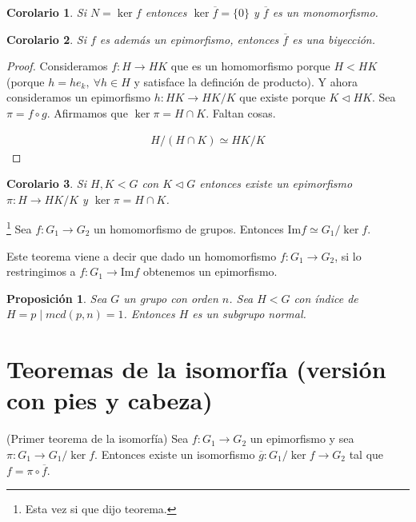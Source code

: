\documentclass{book}
\newtheorem*{cor}{Corolario}
\newtheorem{pro}{Proposición}
\theoremstyle{definition}
\theoremstyle{remark}
\newcommand{\normsub}{\mathbin{\triangleleft}}
\newcommand{\ima}{\text{Im}}
\newcommand{\isom}{\simeq}
\begin{document}
\begin{cor}
	Si $N = \ker f$ entonces $\ker \overline{f} = \{0\}$ y $\overline{f}$ es un monomorfismo.
\end{cor}

\begin{cor} %
	Si $f$ es además un epimorfismo, entonces $\overline{f}$ es una biyección.
\end{cor}




\begin{proof}
	Consideramos $f:H \to HK$ que es un homomorfismo porque $H < HK$ (porque $h = he_k,\ \forall h \in H$ y satisface la definción de producto). Y ahora consideramos un epimorfismo $h:HK \to HK/K$ que existe porque $K \normsub HK$. Sea $\pi = f \circ g$. Afirmamos que $\ker \pi = H \cap K$. Faltan cosas.
	
	\begin{align*}
		H/(H\cap K) \isom HK/K
	\end{align*}
\end{proof}

\begin{cor}
	Si $H,K < G$ con $K \normsub G$ entonces existe un epimorfismo $\pi:H\to HK/K$ y $\ker \pi = H \cap K$.
\end{cor}

\begin{thm}\footnote{Esta vez si que dijo teorema.}
	Sea $f:G_1 \to G_2$ un homomorfismo de grupos. Entonces $\ima f \isom G_1 / \ker f$.
\end{thm}

Este teorema viene a decir que dado un homomorfismo $f:G_1 \to G_2$, si lo restringimos a $f:G_1 \to \ima f$ obtenemos un epimorfismo.


\begin{pro}
	Sea $G$ un grupo con orden $n$. Sea $H < G$ con índice de $H = p \mid mcd(p,n) = 1$. Entonces $H$ es un subgrupo normal.
\end{pro}

\section{Teoremas de la isomorfía (versión con pies y cabeza)}

\begin{thm}(Primer teorema de la isomorfía)
	Sea $f:G_1 \to G_2$ un epimorfismo y sea $\pi:G_1 \to G_1/\ker f$. Entonces existe un isomorfismo $\overline{g} : G_1 / \ker f \to G_2$ tal que $f = \pi \circ \overline{f}$.
\end{thm}
\end{document}

